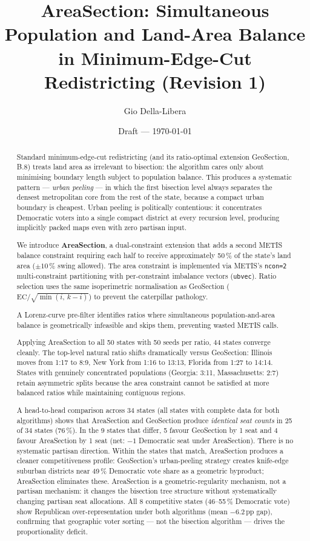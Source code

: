 \documentclass[12pt]{article}
\title{AreaSection: Simultaneous Population and Land-Area Balance\\
       in Minimum-Edge-Cut Redistricting (Revision 1)}
\author{Gio Della-Libera}
\date{Draft --- \today}
\begin{document}
\maketitle

\begin{abstract}
Standard minimum-edge-cut redistricting (and its ratio-optimal extension
GeoSection, B.8) treats land area as irrelevant to bisection: the algorithm
cares only about minimising boundary length subject to population balance.
This produces a systematic pattern --- \emph{urban peeling} --- in which the
first bisection level always separates the densest metropolitan core from the
rest of the state, because a compact urban boundary is cheapest.
Urban peeling is politically contentious: it concentrates Democratic voters
into a single compact district at every recursion level, producing implicitly
packed maps even with zero partisan input.

We introduce \textbf{AreaSection}, a dual-constraint extension that adds a
second METIS balance constraint requiring each half to receive approximately
50\,\% of the state's land area ($\pm 10$\,\% swing allowed).
The area constraint is implemented via METIS's \texttt{ncon=2} multi-constraint
partitioning with per-constraint imbalance vectors (\texttt{ubvec}).
Ratio selection uses the same isoperimetric normalisation as GeoSection
($\mathrm{EC}/\sqrt{\min(i,\,k-i)}$) to prevent the caterpillar pathology.

A Lorenz-curve pre-filter identifies ratios where simultaneous
population-and-area balance is geometrically infeasible and skips them,
preventing wasted METIS calls.

Applying AreaSection to all 50 states with 50 seeds per ratio,
44 states converge cleanly.
The top-level natural ratio shifts dramatically versus GeoSection:
Illinois moves from 1:17 to 8:9, New York from 1:16 to 13:13, Florida from
1:27 to 14:14.
States with genuinely concentrated populations (Georgia: 3:11, Massachusetts: 2:7)
retain asymmetric splits because the area constraint cannot be satisfied at
more balanced ratios while maintaining contiguous regions.

A head-to-head comparison across 34 states (all states with complete data
for both algorithms) shows that AreaSection and GeoSection produce
\emph{identical seat counts} in 25 of 34 states (76\,\%).
In the 9 states that differ, 5 favour GeoSection by 1 seat and 4 favour
AreaSection by 1 seat (net: $-1$ Democratic seat under AreaSection).
There is no systematic partisan direction.
Within the states that match, AreaSection produces a cleaner competitiveness
profile: GeoSection's urban-peeling strategy creates knife-edge suburban
districts near 49\,\% Democratic vote share as a geometric byproduct;
AreaSection eliminates these.
AreaSection is a geometric-regularity mechanism, not a partisan mechanism:
it changes the bisection tree structure without systematically changing partisan seat allocations.
All 8 competitive states (46--55\,\% Democratic vote) show Republican
over-representation under both algorithms (mean $-6.2$\,pp gap), confirming
that geographic voter sorting — not the bisection algorithm — drives the
proportionality deficit.
\end{abstract}










\end{document}
